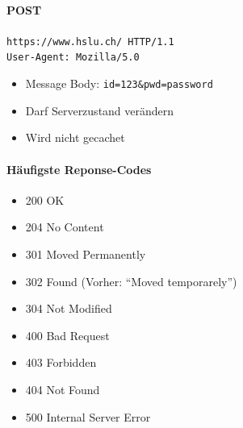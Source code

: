 \documentclass[10pt,a4paper]{article}
\begin{document}
\paragraph*{POST}\texttt{https://www.hslu.ch/ HTTP/1.1\\
User-Agent: Mozilla/5.0}
\begin{itemize}[noitemsep,topsep=0pt,leftmargin=*]
    \item Message Body: \texttt{id=123\&pwd=password}
    \item Darf Serverzustand verändern
    \item Wird nicht gecachet
\end{itemize}

\paragraph*{Häufigste Reponse-Codes}
\begin{itemize}[noitemsep,topsep=0pt,leftmargin=*]
    \item 200 OK
    \item 204 No Content
    \item 301 Moved Permanently
    \item 302 Found (Vorher: "`Moved temporarely"')
    \item 304 Not Modified
    \item 400 Bad Request
    \item 403 Forbidden
    \item 404 Not Found
    \item 500 Internal Server Error
\end{itemize}
\end{document}
